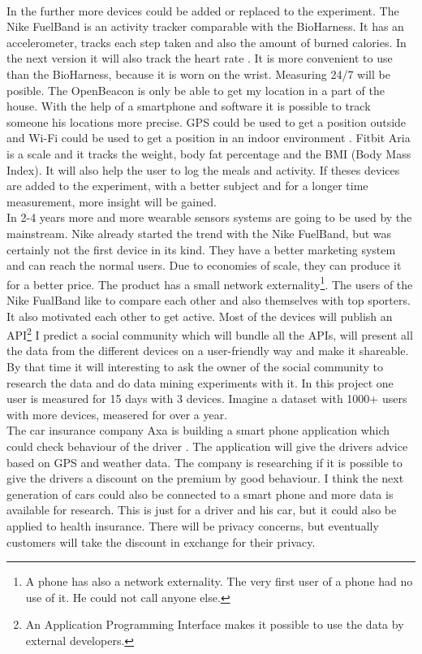 	\\
	In the further more devices could be added or replaced to the experiment. The Nike FuelBand \cite{fuelband} is an activity tracker comparable with the BioHarness. It has an accelerometer, tracks each step taken and also the amount of burned calories. In the next version it will also track the heart rate \cite{fuelband2}. It is more convenient to use than the BioHarness, because it is worn on the wrist. Measuring 24/7 will be posible. The OpenBeacon is only be able to get my location in a part of the house. With the help of a smartphone and software it is possible to track someone his locations more precise. GPS could be used to get a position outside and Wi-Fi could be used to get a position in an indoor environment \cite{Howard-2003-283}. Fitbit Aria \cite{aria} is a scale and it tracks the weight, body fat percentage and the BMI (Body Mass Index). It will also help the user to log the meals and activity. If theses devices are added to the experiment, with a better subject and for a longer time measurement, more insight will be gained.
	\\
	In 2-4 years more and more wearable sensors systems are going to be used by the mainstream. Nike already started the trend with the Nike FuelBand, but was certainly not the first device in its kind. They have a better marketing system and can reach the normal users. Due to economies of scale, they can produce it for a better price. The product has a small network externality\footnote{A phone has also a network externality. The very first user of a phone had no use of it. He could not call anyone else.}. The users of the Nike FualBand like to compare each other and also themselves with top sporters. It also motivated each other to get active. Most of the devices will publish an API\footnote{An Application Programming Interface makes it possible to use the data by external developers.} I predict a social community which will bundle all the APIs, will present all the data from the different devices on a user-friendly way and make it shareable. By that time it will interesting to ask the owner of the social community to research the data and do data mining experiments with it. In this project one user is measured for 15 days with 3 devices. Imagine a dataset with 1000+ users with more devices, measered for over a year.
	\\	
	The car insurance company Axa is building a smart phone application which could check behaviour of the driver \cite{axa}. The application will give the drivers advice based on GPS and weather data. The company is researching if it is possible to give the drivers a discount on the premium by good behaviour. I think the next generation of cars could also be connected to a smart phone and more data is available for research. This is just for a driver and his car, but it could also be applied to health insurance. There will be privacy concerns, but eventually customers will take the discount in exchange for their privacy. 
